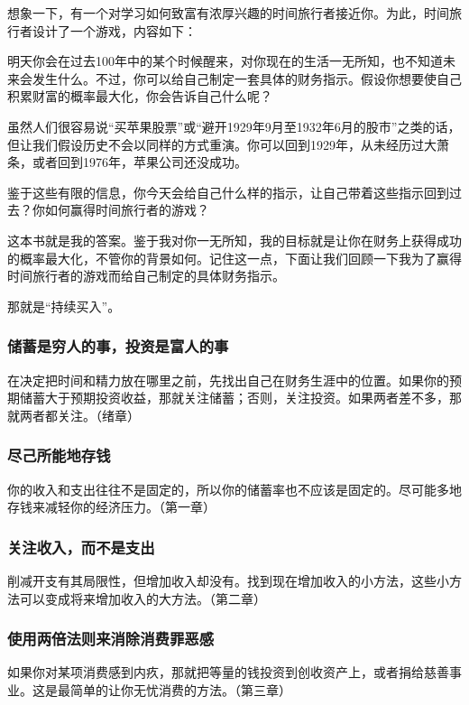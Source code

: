 
想象一下，有一个对学习如何致富有浓厚兴趣的时间旅行者接近你。为此，时间旅行者设计了一个游戏，内容如下：

明天你会在过去100年中的某个时候醒来，对你现在的生活一无所知，也不知道未来会发生什么。不过，你可以给自己制定一套具体的财务指示。假设你想要使自己积累财富的概率最大化，你会告诉自己什么呢？

虽然人们很容易说“买苹果股票”或“避开1929年9月至1932年6月的股市”之类的话，但让我们假设历史不会以同样的方式重演。你可以回到1929年，从未经历过大萧条，或者回到1976年，苹果公司还没成功。

鉴于这些有限的信息，你今天会给自己什么样的指示，让自己带着这些指示回到过去？你如何赢得时间旅行者的游戏？

这本书就是我的答案。鉴于我对你一无所知，我的目标就是让你在财务上获得成功的概率最大化，不管你的背景如何。记住这一点，下面让我们回顾一下我为了赢得时间旅行者的游戏而给自己制定的具体财务指示。

那就是“持续买入”。

\subsubsection{储蓄是穷人的事，投资是富人的事}
在决定把时间和精力放在哪里之前，先找出自己在财务生涯中的位置。如果你的预期储蓄大于预期投资收益，那就关注储蓄；否则，关注投资。如果两者差不多，那就两者都关注。（绪章）

\subsubsection{尽己所能地存钱}
你的收入和支出往往不是固定的，所以你的储蓄率也不应该是固定的。尽可能多地存钱来减轻你的经济压力。（第一章）

\subsubsection{关注收入，而不是支出}
削减开支有其局限性，但增加收入却没有。找到现在增加收入的小方法，这些小方法可以变成将来增加收入的大方法。（第二章）

\subsubsection{使用两倍法则来消除消费罪恶感}
如果你对某项消费感到内疚，那就把等量的钱投资到创收资产上，或者捐给慈善事业。这是最简单的让你无忧消费的方法。（第三章）

